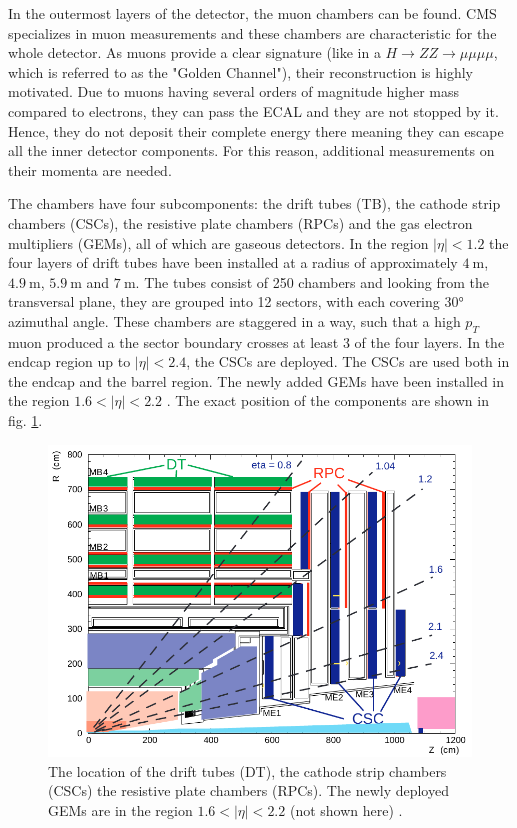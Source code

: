 
In the outermost layers of the detector, the muon chambers can be found. CMS specializes in muon measurements and these chambers are characteristic for the whole detector. As muons provide a clear signature (like in a $H \rightarrow ZZ \rightarrow \mu\mu\mu\mu$, which is referred to as the "Golden Channel"), their reconstruction is highly motivated. Due to muons having several orders of magnitude higher mass compared to electrons, they can pass the ECAL and they are not stopped by it.  Hence, they do not deposit their complete energy there meaning they can escape all the inner detector components. For this reason, additional measurements on their momenta are needed.

The chambers have four subcomponents: the drift tubes (TB), the cathode strip chambers (CSCs), the resistive plate chambers (RPCs) and the gas electron multipliers (GEMs), all of which are gaseous detectors. In the region $|\eta|<1.2$ the four layers of drift tubes have been installed at a radius of approximately $\SI{4}{\meter}$, $\SI{4.9}{\meter}$, $\SI{5.9}{\meter}$ and $\SI{7}{\meter}$. The tubes consist of 250 chambers and looking from the transversal plane, they are grouped into 12 sectors, with each covering 30° azimuthal angle. These chambers are staggered in a way, such that a high $p_T$ muon produced a the sector boundary crosses at least 3 of the four layers. In the endcap region up to $|\eta| < 2.4$, the CSCs are deployed. The CSCs are used both in the endcap and the barrel region. The newly added GEMs have been installed in the region $1.6 < |\eta| < 2.2$ \cite{Colaleo:2021453}. The exact position of the components are shown in fig. \ref{fig:muonchambers}.

\begin{figure}[h!]
	\centering
	\includegraphics[width=0.8\linewidth]{figures/experiment/muonchambers.pdf}
	\caption{The location of the drift tubes (DT), the cathode strip chambers (CSCs) the resistive plate chambers (RPCs). The newly deployed GEMs are in the region $1.6 < |\eta| < 2.2$ (not shown here) \cite{Bayatian:922757}.}
	\label{fig:muonchambers}
\end{figure}

